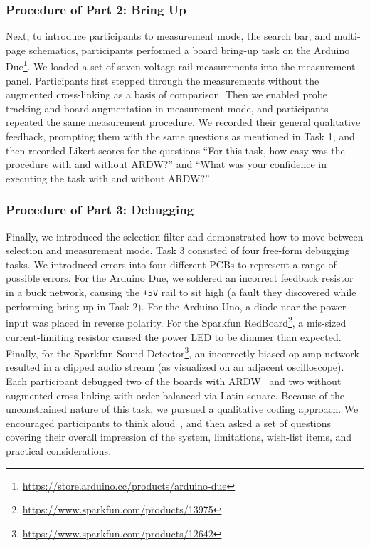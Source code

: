 \documentclass [11pt, proquest] {uwthesis}[2020/02/24]
\newcommand{\ARDWname}{ARDW}
\begin{document}
\subsubsection{Procedure of Part 2: Bring Up}
Next, to introduce participants to measurement mode,
the search bar, and multi-page schematics,
participants performed a board bring-up task on the Arduino Due\footnote{\url{https://store.arduino.cc/products/arduino-due}}. We loaded a set of seven voltage rail measurements into the measurement panel. Participants first stepped through the measurements without the augmented cross-linking as a basis of comparison. Then we enabled probe tracking and board augmentation in measurement mode, and participants repeated the same measurement procedure. 
We recorded their general qualitative feedback, prompting them with the same questions as mentioned in Task 1, and then recorded Likert scores for the questions ``For this task, how easy was the procedure with and without \ARDWname?'' and ``What was your confidence in executing the task with and without \ARDWname?''


\subsubsection{Procedure of Part 3: Debugging}
Finally, we introduced the selection filter and demonstrated how to move between selection and measurement mode. Task 3 consisted of four free-form debugging tasks. We introduced errors into four different PCBs to represent a range of possible errors. For the Arduino Due, we soldered an incorrect feedback resistor in a buck network, causing the \verb|+5V| rail to sit high (a fault they discovered while performing bring-up in Task 2). For the Arduino Uno, a diode near the power input was placed in reverse polarity. For the Sparkfun RedBoard\footnote{\url{https://www.sparkfun.com/products/13975}}, a mis-sized current-limiting resistor caused the power LED to be dimmer than expected. Finally, for the Sparkfun Sound Detector\footnote{\url{https://www.sparkfun.com/products/12642}}, an incorrectly biased op-amp network resulted in a clipped audio stream (as visualized on an adjacent oscilloscope).
Each participant debugged two of the boards with \ARDWname~ and two without augmented cross-linking with order balanced via Latin square.
Because of the unconstrained nature of this task, we pursued a qualitative coding approach.
We encouraged participants to think aloud~\cite{Lewis1982UsingDesign}, and then asked a set of questions covering their overall impression of the system, limitations, wish-list items, and practical considerations. 
\end{document}
